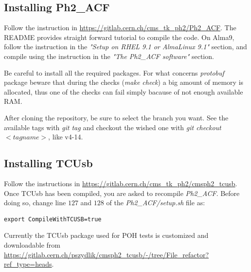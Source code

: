 \documentclass[10pt,a4paper]{article}
\begin{document}
\subsection{Installing Ph2\_ACF}
Follow the instruction in \url{https://gitlab.cern.ch/cms_tk_ph2/Ph2_ACF}. 
The README provides straight forward tutorial to compile the code. On Alma9, follow the instruction in the \emph{"Setup on RHEL 9.1 or AlmaLinux 9.1"} section, and compile using the instruction in the \emph{"The Ph2\_ACF software"} section.

Be careful to install all the required packages. For what concerns {\it protobuf} package beware that during the checks (\emph{make check}) a big amount of memory is allocated, thus one of the checks can fail simply bacause of not enough available RAM.  

After cloning the repository, be sure to select the branch you want. See the available tags with \emph{git tag} and checkout the wished one with \emph{git checkout $<tagname>$}, like v4-14.


\subsection{Installing TCUsb}
Follow the instructions in \url{https://gitlab.cern.ch/cms_tk_ph2/cmsph2_tcusb}.
Once TCUsb has been compiled, you are asked to recompile \emph{Ph2\_ACF}. Before doing so, change line $127$ and $128$ of the \emph{Ph2\_ACF/setup.sh} file as:
\begin{framed}
\begin{verbatim}
export CompileWithTCUSB=true
\end{verbatim}
\end{framed}

Currently the TCUsb package used for POH tests is customized and downloadable from \url{https://gitlab.cern.ch/pszydlik/cmsph2_tcusb/-/tree/File_refactor?ref_type=heads}.
\end{document}
